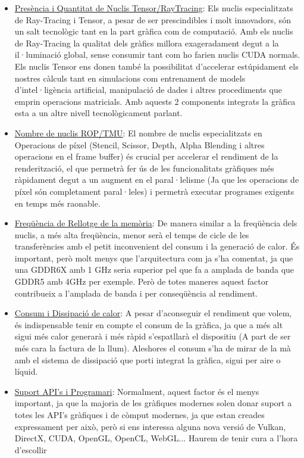 \documentclass[12pt]{article}
\begin{document}
\begin{itemize}
    \item \underline{Presència i Quantitat de Nuclis Tensor/RayTracing}: Els nuclis especialitzats de Ray-Tracing i Tensor, a pesar de ser prescindibles i molt innovadors, són un salt tecnològic tant en la part gràfica com de computació. Amb els nuclis de Ray-Tracing la qualitat dels gràfics millora exageradament degut a la il·luminació global, sense consumir tant com ho farien nuclis CUDA normals. Els nuclis Tensor ens donen també la possibilitat d'accelerar estúpidament els nostres càlculs tant en simulacions com entrenament de models d'intel·ligència artificial, manipulació de dades i altres procediments que emprin operacions matricials. Amb aquests 2 components integrats la gràfica esta a un altre nivell tecnològicament parlant.

    \item \underline{Nombre de nuclis ROP/TMU}: El nombre de nuclis especialitzats en Operacions de píxel (Stencil, Scissor, Depth, Alpha Blending i altres operacions en el frame buffer) és crucial per accelerar el rendiment de la renderització, el que permetrà fer ús de les funcionalitats gràfiques més ràpidament degut a un augment en el paral·lelisme (Ja que les operacions de píxel són completament paral·leles) i permetrà executar programes exigents en temps més raonable.

    \item \underline{Freqüència de Rellotge de la memòria}: De manera similar a la freqüència dels nuclis, a més alta freqüència, menor serà el temps de cicle de les transferències amb el petit inconvenient del consum i la generació de calor. És important, però molt menys que l'arquitectura com ja s'ha comentat, ja que una GDDR6X amb 1 GHz seria superior pel que fa a amplada de banda que GDDR5 amb 4GHz per exemple. Però de totes maneres aquest factor contribueix a l'amplada de banda i per conseqüència al rendiment.

    \item \underline{Consum i Dissipació de calor}: A pesar d'aconseguir el rendiment que volem, és indispensable tenir en compte el consum de la gràfica, ja que a més alt sigui més calor generarà i més ràpid s'espatllarà el dispositiu (A part de ser més cara la factura de la llum). Aleshores el consum s'ha de mirar de la mà amb el sistema de dissipació que porti integrat la gràfica, sigui per aire o líquid.

    \item \underline{Suport API's i Programari}: Normalment, aquest factor és el menys important, ja que la majoria de les gràfiques modernes solen donar suport a totes les API's gràfiques i de còmput modernes, ja que estan creades expressament per això, però si ens interessa alguna nova versió de Vulkan, DirectX, CUDA, OpenGL, OpenCL, WebGL... Haurem de tenir cura a l'hora d'escollir 
 
\end{itemize}
\end{document}
